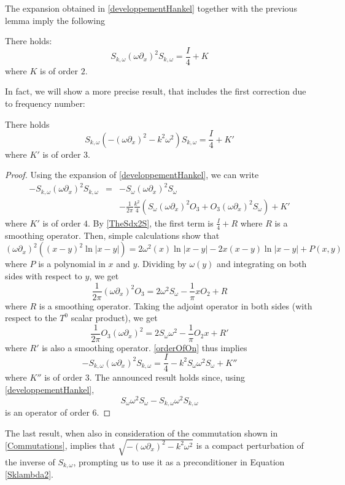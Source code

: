 \documentclass[a4paper]{article}
\begin{document}
The expansion obtained in \autoref{developpementHankel} together with the previous lemma imply the following
\begin{The} There holds:
	\[S_{k,\omega}  (\omega\partial_x)^2 S_{k,\omega} = \frac{I}{4} + K\]
	where $K$ is of order $2$. 
\end{The}

In fact, we will show a more precise result, that includes the first correction due to frequency number:
\begin{The} There holds
	\label{TheHelmholtz}
	\[S_{k,\omega} \left( -(\omega \partial_x)^2 - k^2\omega^2\right) S_{k,\omega} = \frac{I}{4} + K'\]
	where $K'$ is of order $3$. 
	\begin{proof}
		Using the expansion of \autoref{developpementHankel}, we can write 
		\begin{eqnarray*}
			-S_{k,\omega}(\omega \partial_x)^2 S_{k,\omega} &=& -S_\omega (\omega \partial_x)^2 S_\omega \\
			&& - \frac{1}{2\pi}\frac{k^2}{4}\left(S_\omega (\omega \partial_x)^2 O_3 + O_3 (\omega \partial_x)^2 S_\omega\right) + K'
		\end{eqnarray*}
		where $K'$ is of order $4$. By \autoref{TheSdx2S}, the first term is $\frac{I}{4} + R$ where $R$ is a smoothing operator. Then, simple calculations show that
		\[(\omega \partial_x)^2 \left((x - y)^2\ln|x-y|\right) = 2 \omega^2(x)\ln|x-y| -2x(x-y) \ln|x-y| + P(x,y)\]
		where $P$ is a polynomial in $x$ and $y$. Dividing by $\omega(y)$ and integrating on both sides with respect to $y$, we get 
		\[\frac{1}{2\pi}(\omega \partial_x)^2 O_3 = 2 \omega^2 S_\omega - \frac{1}{\pi}xO_2 + R \]
		where $R$ is a smoothing operator. Taking the adjoint operator in both sides (with respect to the $T^0$ scalar product), we get
		\[\frac{1}{2\pi}O_3(\omega \partial_x)^2 = 2 S_\omega\omega^2 - \frac{1}{\pi}O_2x + R'\]
		where $R'$ is also a smoothing operator. \autoref{orderOfOn} thus implies
		\[-S_{k,\omega}(\omega \partial_x)^2 S_{k,\omega} = \frac{I}{4} - k^2S_\omega \omega^2 S_\omega + K''\]
		where $K''$ is of order $3$.
		The announced result holds since, using \autoref{developpementHankel}, 
		\[S_\omega \omega^2 S_\omega - S_{k,\omega} \omega^2 S_{k,\omega}\]
		is an operator of order $6$.
	\end{proof}
\end{The}


The last result, when also in consideration of the commutation shown in \autoref{Commutations}, implies that $\sqrt{ -(\omega \partial_x)^2 - k^2\omega^2}$ is a compact perturbation of the inverse of $S_{k,\omega}$, prompting us to use it as a preconditioner in Equation \eqref{Sklambda2}.
\end{document}
